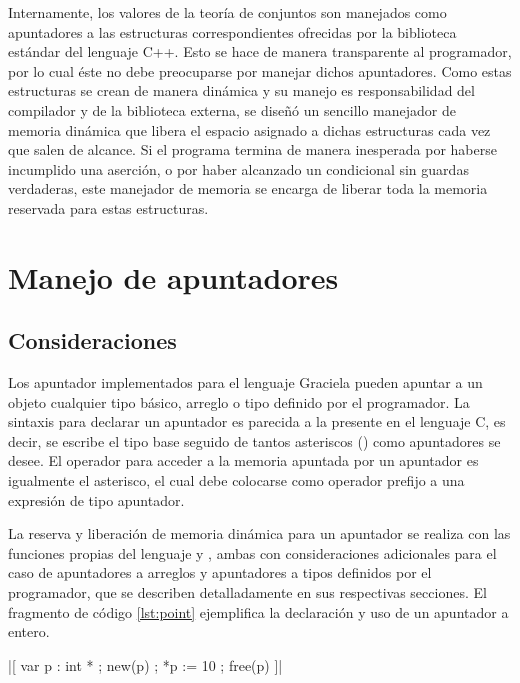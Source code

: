{{Internamente, los valores de la teoría de conjuntos son manejados como
apuntadores a las estructuras correspondientes ofrecidas por la biblioteca
estándar del lenguaje C++. Esto se hace de manera transparente al programador,
por lo cual éste no debe preocuparse por manejar dichos apuntadores. Como  estas
estructuras se crean de manera dinámica y su manejo es responsabilidad del
compilador y de la biblioteca externa, se diseñó un sencillo manejador de
memoria dinámica que libera el espacio asignado a dichas estructuras cada vez
que salen de alcance. Si el programa termina de manera inesperada por haberse
incumplido una aserción, o por haber alcanzado un condicional sin guardas
verdaderas, este manejador de memoria se encarga de liberar toda la memoria
reservada para estas estructuras.


\section{Manejo de apuntadores}

\subsection{Consideraciones}
Los apuntador implementados para el lenguaje Graciela pueden apuntar a un
objeto cualquier tipo básico, arreglo o tipo definido por el programador. La
sintaxis para declarar un apuntador es parecida a la presente en  el lenguaje
C, es decir, se escribe el tipo base seguido de tantos asteriscos (\ingra{*})
como apuntadores se desee. El operador para acceder a la memoria apuntada por
un apuntador es igualmente el asterisco, el cual debe colocarse como operador
prefijo a una expresión de tipo apuntador.

La reserva y liberación de memoria dinámica para un apuntador se realiza con las
funciones propias del lenguaje  y , ambas con
consideraciones adicionales para el caso de apuntadores a arreglos y apuntadores
a tipos definidos por el programador, que se describen detalladamente en sus
respectivas secciones. El fragmento de código \ref{lst:point} ejemplifica la
declaración y uso de un apuntador a entero.

\begin{gracielacode}[caption=Ejemplo de apuntadores, label=lst:point]
|[ var p : int *
;  new(p)
;  *p := 10
;  free(p)
]|
\end{gracielacode}

}}
